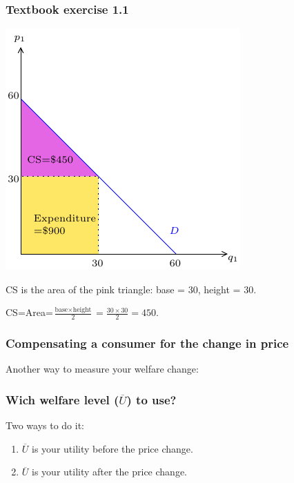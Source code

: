\documentclass[xcolor=pdftex,dvipsnames]{beamer}
\begin{document}
\begin{frame}
\frametitle{Textbook exercise 1.1}
\begin{center}\includegraphics{pics/Exercise1}\end{center}
CS is the area of the pink triangle: base = 30, height = 30.
 \bigskip

CS=Area=$\frac{\text{base}\times\text{height}}{2} = \frac{30\times 30}{2}=450$.
\end{frame}





\begin{frame}
\frametitle{Compensating a consumer for the change in price}
Another way to measure your welfare change:



\end{frame}




\begin{frame}
\frametitle{Wich welfare level ($\overline U$) to use?}
Two ways to do it:
\begin{enumerate}[<+->]
\item $\overline U$ is your utility before the price change.
\item $\overline U$ is your utility after the price change.
\end{enumerate}
\end{frame}
\end{document}
